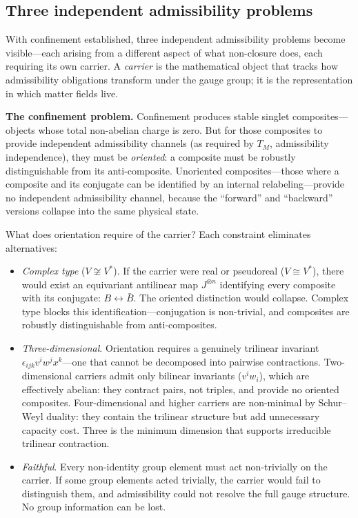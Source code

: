 \documentclass[11pt]{article}
\newenvironment{varlist}{\begin{itemize}[nosep,leftmargin=2em]}{\end{itemize}}
\begin{document}
\subsection{Three independent admissibility problems}

With confinement established, three independent admissibility problems become visible---each arising from a different aspect of what non-closure does, each requiring its own carrier.  A \emph{carrier} is the mathematical object that tracks how admissibility obligations transform under the gauge group; it is the representation in which matter fields live.

\textbf{The confinement problem.}  Confinement produces stable singlet composites---objects whose total non-abelian charge is zero.  But for those composites to provide independent admissibility channels (as required by $T_M$, admissibility independence), they must be \emph{oriented}: a composite must be robustly distinguishable from its anti-composite.  Unoriented composites---those where a composite and its conjugate can be identified by an internal relabeling---provide no independent admissibility channel, because the ``forward'' and ``backward'' versions collapse into the same physical state.

What does orientation require of the carrier?  Each constraint eliminates alternatives:

\begin{varlist}
\item \textit{Complex type} ($V \not\cong V^*$).  If the carrier were real or pseudoreal ($V \cong V^*$), there would exist an equivariant antilinear map $J^{\otimes n}$ identifying every composite with its conjugate: $B \leftrightarrow \bar{B}$.  The oriented distinction would collapse.  Complex type blocks this identification---conjugation is non-trivial, and composites are robustly distinguishable from anti-composites.
\item \textit{Three-dimensional}.  Orientation requires a genuinely trilinear invariant $\epsilon_{ijk} v^i w^j x^k$---one that cannot be decomposed into pairwise contractions.  Two-dimensional carriers admit only bilinear invariants ($v^i w_i$), which are effectively abelian: they contract pairs, not triples, and provide no oriented composites.  Four-dimensional and higher carriers are non-minimal by Schur--Weyl duality: they contain the trilinear structure but add unnecessary capacity cost.  Three is the minimum dimension that supports irreducible trilinear contraction.
\item \textit{Faithful}.  Every non-identity group element must act non-trivially on the carrier.  If some group elements acted trivially, the carrier would fail to distinguish them, and admissibility could not resolve the full gauge structure.  No group information can be lost.
\end{varlist}
\end{document}

